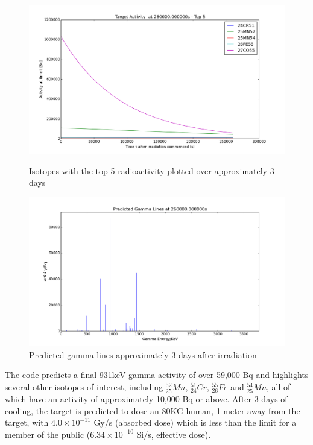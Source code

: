 \FloatBarrier
\begin{figure}[!htb]
\includegraphics[width=\linewidth]{chapters/activity_code/fe-activity-v1/activityTop5_Fe36MeV.png}
\caption{Isotopes with the top 5 radioactivity plotted over approximately 3 days}
\label{fig:act1top5radioactive}
\endminipage\hfill
{}
\includegraphics[width=\linewidth]{chapters/activity_code/fe-activity-v1/gammaLines_Fe36MeV.png}
\caption{Predicted gamma lines approximately 3 days after irradiation}
\label{fig:act1gammalines}
\endminipage
\end{figure}
\FloatBarrier

The code predicts a final 931keV gamma activity of over 59,000 Bq and highlights several other isotopes of interest, including ${}^{52}_{25} Mn$, ${}^{51}_{24} Cr$, ${}^{55}_{26} Fe$ and ${}^{54}_{25} Mn$, all of which have an activity of approximately 10,000 Bq or above.  After 3 days of cooling, the target is predicted to dose an 80KG human, 1 meter away from the target, with $4.0 \times 10^{-11}$ Gy/s (absorbed dose) which is less than the limit for a member of the public ($6.34 \times 10^{-10}$ Si/s, effective dose). 




